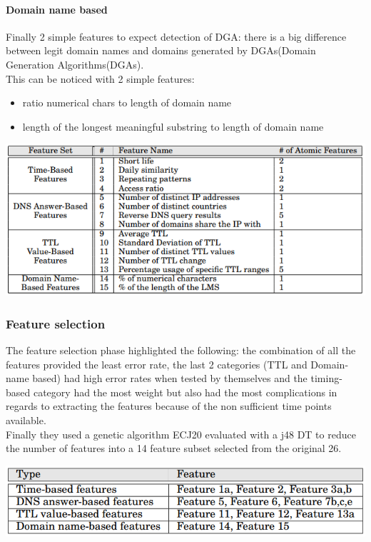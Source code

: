 \paragraph{Domain name based}
Finally 2 simple features to expect detection of DGA: there is a big difference between legit domain names and domains generated by DGAs(Domain Generation Algorithms(DGAs).\\
This can be noticed with 2 simple features:\\
\begin{itemize}[noitemsep]
\item ratio numerical chars to length of domain name
\item length of the longest meaningful substring to length of domain name
\end{itemize}

\includegraphics[scale=.7]{img/exposure_all_features.png}

\subsubsection{Feature selection}
The feature selection phase highlighted the following: the combination of all the features provided the least error rate, the last 2 categories (TTL and Domain-name based) had high error rates when tested by themselves and the timing-based category had the most weight but also had the most complications in regards to extracting the features because of the non sufficient time points available. \\
Finally they used a genetic algorithm ECJ20 evaluated with a j48 DT to reduce the number of features into a 14 feature subset selected from the original 26.

\includegraphics[scale=.7]{img/exposure_ga.png}


